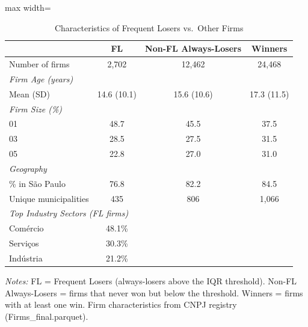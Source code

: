 \begin{table}[htbp]
\centering
\caption{Characteristics of Frequent Losers vs.\ Other Firms}
\label{tab:fl_characteristics}
\begin{adjustbox}{max width=\textwidth}
\begin{threeparttable}
\small
\begin{tabular}{lccc}
\toprule
 & FL & Non-FL Always-Losers & Winners \\
\midrule
Number of firms & 2,702 & 12,462 & 24,468 \\
\midrule
\multicolumn{4}{l}{\textit{Firm Age (years)}} \\
Mean (SD) & 14.6 (10.1) & 15.6 (10.6) & 17.3 (11.5) \\
\midrule
\multicolumn{4}{l}{\textit{Firm Size (\%)}} \\
01 & 48.7 & 45.5 & 37.5 \\
03 & 28.5 & 27.5 & 31.5 \\
05 & 22.8 & 27.0 & 31.0 \\
\midrule
\multicolumn{4}{l}{\textit{Geography}} \\
\% in S\~{a}o Paulo & 76.8 & 82.2 & 84.5 \\
Unique municipalities & 435 & 806 & 1,066 \\
\midrule
\multicolumn{4}{l}{\textit{Top Industry Sectors (FL firms)}} \\
Comércio & 48.1\% & & \\
Serviços & 30.3\% & & \\
Indústria & 21.2\% & & \\
\bottomrule
\end{tabular}
\begin{tablenotes}
\small
\item \textit{Notes:} FL = Frequent Losers (always-losers above the IQR threshold).
Non-FL Always-Losers = firms that never won but below the threshold.
Winners = firms with at least one win.
Firm characteristics from CNPJ registry (Firms\_final.parquet).
\end{tablenotes}
\end{threeparttable}
\end{adjustbox}
\end{table}

